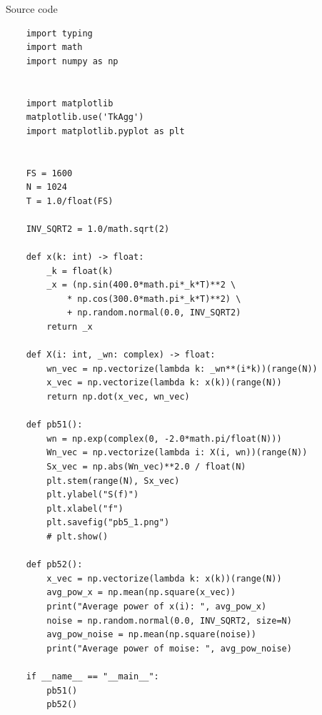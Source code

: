 \documentclass[12pt]{article}
\begin{document}
\FloatBarrier
Source code
\begin{lstlisting}
    import typing
    import math
    import numpy as np
    
    
    import matplotlib
    matplotlib.use('TkAgg')
    import matplotlib.pyplot as plt
    
    
    FS = 1600
    N = 1024
    T = 1.0/float(FS)
    
    INV_SQRT2 = 1.0/math.sqrt(2)
    
    def x(k: int) -> float:
        _k = float(k)
        _x = (np.sin(400.0*math.pi*_k*T)**2 \
            * np.cos(300.0*math.pi*_k*T)**2) \
            + np.random.normal(0.0, INV_SQRT2)
        return _x
    
    def X(i: int, _wn: complex) -> float:
        wn_vec = np.vectorize(lambda k: _wn**(i*k))(range(N))
        x_vec = np.vectorize(lambda k: x(k))(range(N))
        return np.dot(x_vec, wn_vec)
    
    def pb51():
        wn = np.exp(complex(0, -2.0*math.pi/float(N)))
        Wn_vec = np.vectorize(lambda i: X(i, wn))(range(N))
        Sx_vec = np.abs(Wn_vec)**2.0 / float(N)
        plt.stem(range(N), Sx_vec)
        plt.ylabel("S(f)")
        plt.xlabel("f")
        plt.savefig("pb5_1.png")
        # plt.show()
    
    def pb52():
        x_vec = np.vectorize(lambda k: x(k))(range(N))
        avg_pow_x = np.mean(np.square(x_vec))
        print("Average power of x(i): ", avg_pow_x)
        noise = np.random.normal(0.0, INV_SQRT2, size=N)
        avg_pow_noise = np.mean(np.square(noise))
        print("Average power of moise: ", avg_pow_noise)
    
    if __name__ == "__main__":
        pb51()
        pb52()

\end{lstlisting}
\end{document}
